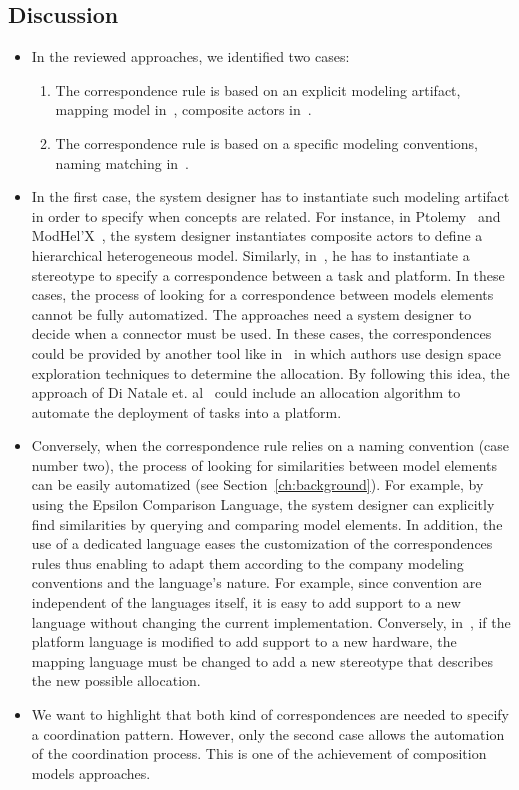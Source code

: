 	\subsection{Discussion}
	\begin{itemize} 
			\item In the reviewed approaches, we identified two cases:
			\begin{enumerate}
				\item The correspondence rule is based on an explicit modeling artifact, \eg mapping model in~\cite{dinatale}, composite actors in~\cite{modhelxbib, ptoleframebib}. 	
				\item The correspondence rule is based on a specific modeling conventions, \eg naming matching in~\cite{mascotbib}.
			\end{enumerate}
				
			\item In the first case, the system designer has to instantiate such modeling artifact in order to specify when concepts are related. For instance, in Ptolemy~\cite{ptoleframebib} and ModHel'X~\cite{modhelxbib}, the system designer instantiates composite actors to define a hierarchical heterogeneous model. Similarly, in~\cite{dinatale}, he has to instantiate a stereotype to specify a correspondence between a task and platform. In these cases, the process of looking for a correspondence between models elements cannot be fully automatized. The approaches need a system designer to decide when a connector must be used. In these cases, the correspondences could be provided by another tool like in~\cite{kofmanbib} in which authors use design space exploration techniques to determine the allocation. By following this idea, the approach of Di Natale et. al~\cite{dinatale} could include an allocation algorithm to automate the deployment of tasks into a platform. 
			
			\item Conversely, when the correspondence rule relies on a naming convention (case number two), the process of looking for similarities between model elements can be easily automatized (see Section~\ref{ch:background}). For example, by using the Epsilon Comparison Language, the system designer can explicitly find similarities by querying and comparing model elements. In addition, the use of a dedicated language eases the customization of the correspondences rules thus enabling to adapt them according to the company modeling conventions and the language's nature. For example, since convention are independent of the languages itself, it is easy to add support to a new language without changing the current implementation. Conversely, in~\cite{dinatale}, if the platform language is modified to add support to a new hardware, the mapping language must be changed to add a new stereotype that describes the new possible allocation. 
			
			\item We want to highlight that both kind of correspondences are needed to specify a coordination pattern. However, only the second case allows the automation of the coordination process. This is one of the achievement of composition models approaches.  

			\end{itemize}
